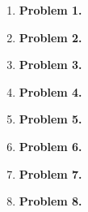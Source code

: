 \documentclass[letterpaper]{article}
\begin{document}
	\begin{enumerate} 
		\item [] \textbf{Problem 1.}
		\item [] \textbf{Problem 2.}	
		\item [] \textbf{Problem 3.}	
		\item [] \textbf{Problem 4.}	
		\item [] \textbf{Problem 5.}
		\item [] \textbf{Problem 6.}
		\item [] \textbf{Problem 7.}
		\item [] \textbf{Problem 8.}
	\end{enumerate}
\end{document}
